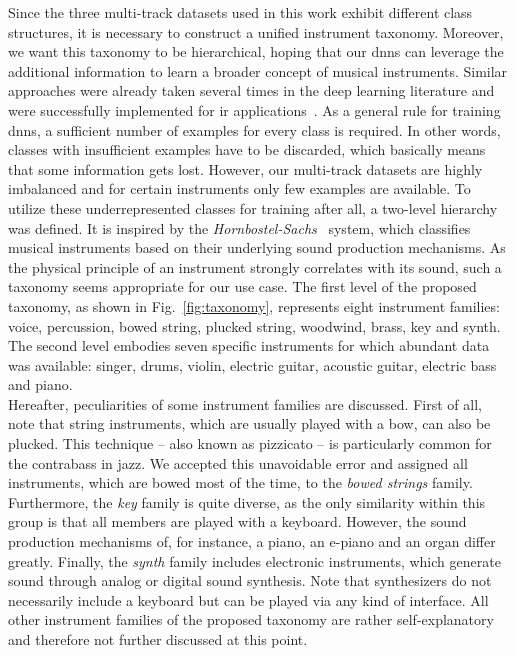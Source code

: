 Since the three multi-track datasets used in this work exhibit different class structures, it is necessary to construct a unified instrument taxonomy. Moreover, we want this taxonomy to be hierarchical, hoping that our \glspl{dnn} can leverage the additional information to learn a broader concept of musical instruments. Similar approaches were already taken several times in the deep learning literature and were successfully implemented for \gls{ir} applications~\cite{garcia2021leveraging}. As a general rule for training \glspl{dnn}, a sufficient number of examples for every class is required. In other words, classes with insufficient examples have to be discarded, which basically means that some information gets lost. However, our multi-track datasets are highly imbalanced and for certain instruments only few examples are available. To utilize these underrepresented classes for training after all, a two-level hierarchy was defined. It is inspired by the \textit{Hornbostel-Sachs}~\cite{hornbostel1914systematik} system, which classifies musical instruments based on their underlying sound production mechanisms. As the physical principle of an instrument strongly correlates with its sound, such a taxonomy seems appropriate for our use case. The first level of the proposed taxonomy, as shown in Fig.~\ref{fig:taxonomy}, represents eight instrument families: voice, percussion, bowed string, plucked string, woodwind, brass, key and synth. The second level embodies seven specific instruments for which abundant data was available: singer, drums, violin, electric guitar, acoustic guitar, electric bass and piano.\\

Hereafter, peculiarities of some instrument families are discussed. First of all, note that string instruments, which are usually played with a bow, can also be plucked. This technique -- also known as pizzicato -- is particularly common for the contrabass in jazz. We accepted this unavoidable error and assigned all instruments, which are bowed most of the time, to the \textit{bowed strings} family. Furthermore, the \textit{key} family is quite diverse, as the only similarity within this group is that all members are played with a keyboard. However, the sound production mechanisms of, for instance, a piano, an e-piano and an organ differ greatly. Finally, the \textit{synth} family includes electronic instruments, which generate sound through analog or digital sound synthesis. Note that synthesizers do not necessarily include a keyboard but can be played via any kind of interface. All other instrument families of the proposed taxonomy are rather self-explanatory and therefore not further discussed at this point.
